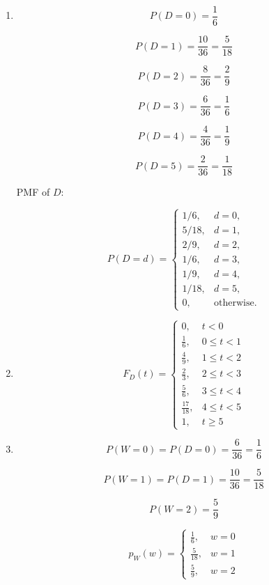 \documentclass[a4paper]{article}
\begin{document}
\begin{enumerate}
    \item[(a)]
    
    $$
    P(D=0) = \frac{1}{6}
    $$

    $$
    P(D=1) = \frac{10}{36} = \frac{5}{18}
    $$

    $$
    P(D=2) = \frac{8}{36} = \frac{2}{9}
    $$

    $$
    P(D=3) = \frac{6}{36} = \frac{1}{6}
    $$

    $$
    P(D=4) = \frac{4}{36} = \frac{1}{9}
    $$

    $$
    P(D=5) = \frac{2}{36} = \frac{1}{18}
    $$

    PMF of $D$:
    
    $$
    P(D=d) =
    \begin{cases}
        1/6,&d=0,\\
        5/18,&d=1,\\
        2/9,&d=2,\\
        1/6,&d=3,\\
        1/9,&d=4,\\
        1/18,&d=5,\\
        0,&\text{otherwise.}
    \end{cases}
    $$

    \item[(b)]
    
    $$
    F_D(t)
    =
    \begin{cases}
        0, & t < 0 \\
        \frac{1}{6}, & 0 \le t < 1 \\
        \frac{4}{9}, & 1 \le t < 2 \\
        \frac{2}{3}, & 2 \le t < 3 \\
        \frac{5}{6}, & 3 \le t < 4 \\
        \frac{17}{18}, & 4 \le t < 5 \\
        1, & t \ge 5
    \end{cases}
    $$

    \item[(c)]
    
    $$
    P(W = 0) = P(D = 0) = \frac{6}{36} = \frac{1}{6}
    $$

    $$
    P(W = 1) = P(D = 1) = \frac{10}{36} = \frac{5}{18}
    $$

    $$
    P(W = 2) = \frac{5}{9}
    $$

    $$
    p_W(w)
    =
    \begin{cases}
        \frac{1}{6}, & w = 0 \\
        \frac{5}{18}, & w = 1 \\
        \frac{5}{9}, & w = 2
    \end{cases}
    $$
\end{enumerate}
\end{document}
